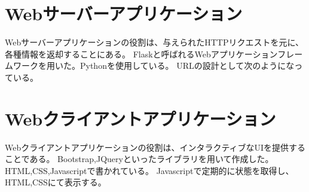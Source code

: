 \section{Webサーバーアプリケーション}
Webサーバーアプリケーションの役割は、与えられたHTTPリクエストを元に、各種情報を返却することにある。
Flaskと呼ばれるWebアプリケーションフレームワークを用いた。Pythonを使用している。
URLの設計として次のようになっている。

\section{Webクライアントアプリケーション}
Webクライアントアプリケーションの役割は、インタラクティブなUIを提供することである。
Bootstrap,JQueryといったライブラリを用いて作成した。HTML,CSS,Javascriptで書かれている。
Javascriptで定期的に状態を取得し、HTML,CSSにて表示する。





